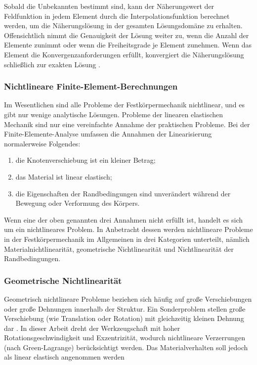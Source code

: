 	Sobald die Unbekannten bestimmt sind, kann der Näherungswert der Feldfunktion in jedem Element durch die Interpolationsfunktion berechnet werden, um die Näherungslösung in der gesamten Lösungsdomäne zu erhalten. Offensichtlich nimmt die Genauigkeit der Lösung weiter zu, wenn die Anzahl der Elemente zunimmt oder wenn die Freiheitsgrade je Element zunehmen. Wenn das Element die Konvergenzanforderungen erfüllt, konvergiert die Näherungslösung schließlich zur exakten Lösung \cite{kattan2010matlab}.
	
	\subsubsection{Nichtlineare Finite-Element-Berechnungen}\label{sec:n.lin_FEM}
	Im Wesentlichen sind alle Probleme der Festkörpermechanik nichtlinear, und es gibt nur wenige analytische Lösungen. Probleme der linearen elastischen Mechanik sind nur eine vereinfachte Annahme der praktischen Probleme. Bei der Finite-Elemente-Analyse umfassen die Annahmen der Linearisierung normalerweise Folgendes:
	\begin{enumerate}
		\item die Knotenverschiebung ist ein kleiner Betrag;
		\item das Material ist linear elastisch;
		\item die Eigenschaften der Randbedingungen sind unverändert während der Bewegung oder Verformung des Körpers.
	\end{enumerate}
	Wenn eine der oben genannten drei Annahmen nicht erfüllt ist, handelt es sich um ein nichtlineares Problem.
	In Anbetracht dessen werden nichtlineare Probleme in der Festkörpermechanik im Allgemeinen in drei Kategorien unterteilt, nämlich Materialnichtlinearität, geometrische Nichtlinearität und Nichtlinearität der Randbedingungen.
	
	\subsubsection{Geometrische Nichtlinearität}\label{sec:geo-n.lin}
	Geometrisch nichtlineare Probleme beziehen sich häufig auf große Verschiebungen oder große Dehnungen innerhalb der Struktur.  Ein Sonderproblem stellen große Verschiebung (wie Translation oder Rotation) mit gleichzeitig kleinen Dehnung dar \cite{rust2011nichtlineare}. In dieser Arbeit dreht der Werkzeugschaft mit hoher Rotationsgeschwindigkeit und Exzentrizität, wodurch nichtlineare Verzerrungen  (nach Green-Lagrange) berücksichtigt werden. Das Materialverhalten soll jedoch als linear elastisch angenommen werden \\
	
